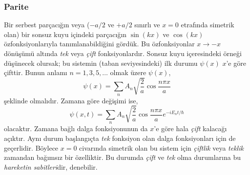 \documentclass[a4paper,12pt, twoside]{article}
\begin{document}
\subsubsection{Parite}




Bir serbest parçacığın veya ($-a/2$ ve $+a/2$ sınırlı ve  $x=0$ etrafında simetrik olan) bir sonsuz kuyu içindeki parçacığın $\sin(kx)$ ve $\cos(kx)$ özfonksiyonlarıyla tanımlanabildiğini gördük. Bu özfonksiyonlar $x \rightarrow -x$ dönüşümü altında \emph{tek} veya \emph{çift} fonksiyonlardır.
Sonsuz kuyu içeresindeki örneği düşünecek olursak; bu sistemin (taban seviyesindeki) ilk durumu $\psi(x)$ $x$'e göre çifttir. Bunun anlamı $n=1,3,5,\ldots$ olmak üzere $\psi(x)$,
\begin{equation}
\psi(x)=\sum_{n} A_{n} \sqrt{\frac{2}{a}} \cos \frac{n \pi x}{a}
\end{equation}
şeklinde olmalıdır. Zamana göre değişimi ise,
\begin{equation}
\psi(x, t)=\sum_{n} A_{n} \sqrt{\frac{2}{a}} \cos \frac{n \pi x}{a} e^{-i E_{n} t / \hbar}
\end{equation}
olacaktır. Zamana bağlı dalga fonksiyonunun da $x$'e göre hala \emph{çift} kalacağı açıktır. Aynı durum başlangıçta \emph{tek} fonksiyon olan dalga fonksiyonları için de geçerlidir. Böylece $x=0$ civarında simetrik olan bu sistem için \emph{çiftlik} veya \emph{teklik} zamandan bağımsız bir özelliktir. Bu durumda \emph{çift} ve \emph{tek} olma durumlarına bu \emph{hareketin sabitleri}dir, denebilir. 
\end{document}
